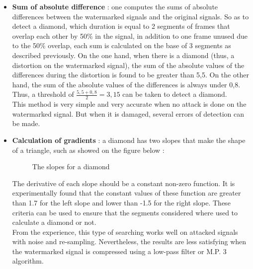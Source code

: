 \begin{itemize}
\item \textbf{Sum of absolute difference} : one computes the sums of absolute differences between the watermarked signals and the original signals. So as to detect a diamond, which duration is equal to 2 segments of frames that overlap each other by 50\% in the signal, in addition to one frame unused due to the 50\% overlap, each sum is calculated on the base of 3 segments as described previously. On the one hand, when there is a diamond (thus, a distortion on the watermarked signal), the sum of the absolute values of the differences during the distortion is found to be greater than 5,5. On the other hand, the sum of the absolute values of the differences is always under 0,8. Thus, a threshold of $\frac{5,5 + 0,8}{2} = 3,15$ can be taken to detect a diamond.\\
This method is very simple and very accurate when no attack is done on the watermarked signal. But when it is damaged, several errors of detection can be made.
\item \textbf{Calculation of gradients} : a diamond has two slopes that make the shape of a triangle, such as showed on the figure below :
\begin{figure}[H]
\caption{\label{slopes} The slopes for a diamond}
\end{figure}
The derivative of each slope should be a constant non-zero function. It is experimentally found that the constant values of these function are greater than 1.7 for the left slope and lower than -1.5 for the right slope. These criteria can be used to ensure that the segments considered where used to calculate a diamond or not.\\
From the experience, this type of searching works well on attacked signals with noise and re-sampling. Nevertheless, the results are less satisfying when the watermarked signal is compressed using a low-pass filter or M.P. 3 algorithm.

\end{itemize}
